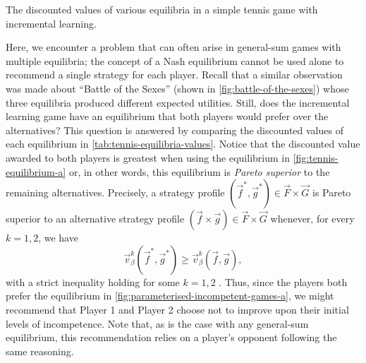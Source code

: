     \begin{table}[t]
        \centering
        
        \caption[Discounted Values of Equilibria in a Tennis Game with Learning]{The discounted values of various equilibria in a simple tennis game with incremental learning.}
        \label{tab:tennis-equilibria-values}
    \end{table}

    Here, we encounter a problem that can often arise in general-sum games with multiple equilibria; the concept of a Nash equilibrium cannot be used alone to recommend a single strategy for each player.
    Recall that a similar observation was made about ``Battle of the Sexes'' (shown in \autoref{fig:battle-of-the-sexes}) whose three equilibria produced different expected utilities.
    Still, does the incremental learning game have an equilibrium that both players would prefer over the alternatives?
    This question is answered by comparing the discounted values of each equilibrium in \autoref{tab:tennis-equilibria-values}.
    Notice that the discounted value awarded to both players is greatest when using the equilibrium in \autoref{fig:tennis-equilibrium-a} or, in other words, this equilibrium is \emph{Pareto superior} to the remaining alternatives.
    Precisely, a strategy profile $(\vec{f}^*, \vec{g}^*) \in \vec{F} \times \vec{G}$ is Pareto superior to an alternative strategy profile $(\vec{f} \times \vec{g}) \in \vec{F} \times \vec{G}$ whenever, for every $k = 1, 2$, we have
    \[
        \vec{v}^k_\beta(\vec{f}^*, \vec{g}^*)
            \ge \vec{v}^k_\beta(\vec{f}, \vec{g}),
    \]
    with a strict inequality holding for some $k = 1, 2$ \parencite{Osborne1994}.
    Thus, since the players both prefer the equilibrium in \autoref{fig:parameterised-incompetent-games-a}, we might recommend that Player 1 and Player 2 choose not to improve upon their initial levels of incompetence.
    Note that, as is the case with any general-sum equilibrium, this recommendation relies on a player's opponent following the same reasoning.